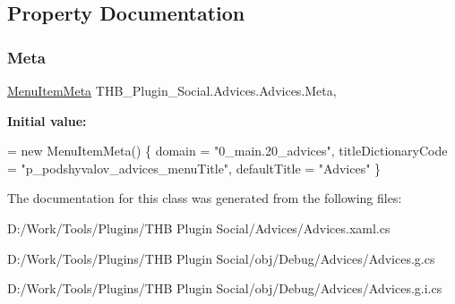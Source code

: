 \subsection{Property Documentation}
\mbox{\label{class_t_h_b___plugin___social_1_1_advices_1_1_advices_a3bf255584096fb4a8f5ec2d7d5048c4c}} 
\subsubsection{\texorpdfstring{Meta}{Meta}}
{\footnotesize\ttfamily \mbox{\hyperlink{class_uniform_client_1_1_plugins_1_1_menu_item_meta}{Menu\+Item\+Meta}} T\+H\+B\+\_\+\+Plugin\+\_\+\+Social.\+Advices.\+Advices.\+Meta\hspace{0.3cm}{\ttfamily [get]}, {\ttfamily [set]}}

{\bfseries Initial value\+:}
\begin{DoxyCode}
= \textcolor{keyword}{new} MenuItemMeta()
        \{
            domain = \textcolor{stringliteral}{"0\_main.20\_advices"},
            titleDictionaryCode = \textcolor{stringliteral}{"p\_podshyvalov\_advices\_menuTitle"},
            defaultTitle = \textcolor{stringliteral}{"Advices"}
        \}
\end{DoxyCode}


The documentation for this class was generated from the following files\+:\begin{DoxyCompactItemize}
\item 
D\+:/\+Work/\+Tools/\+Plugins/\+T\+H\+B Plugin Social/\+Advices/Advices.\+xaml.\+cs\item 
D\+:/\+Work/\+Tools/\+Plugins/\+T\+H\+B Plugin Social/obj/\+Debug/\+Advices/Advices.\+g.\+cs\item 
D\+:/\+Work/\+Tools/\+Plugins/\+T\+H\+B Plugin Social/obj/\+Debug/\+Advices/Advices.\+g.\+i.\+cs\end{DoxyCompactItemize}
